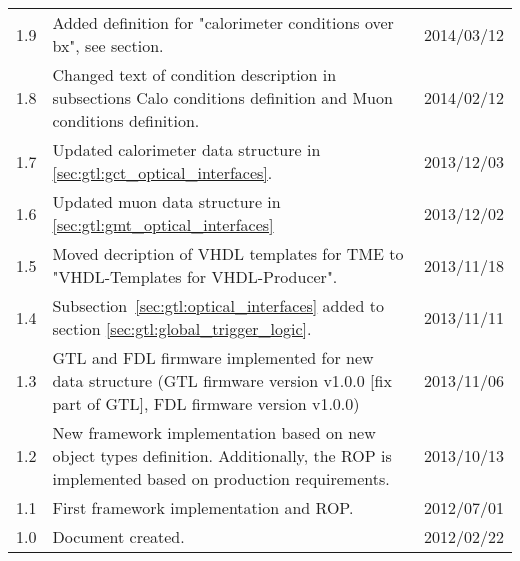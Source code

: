 \begin{longtable}{|c|p{}|c|}
$$1.9 & Added definition for "calorimeter conditions over bx", see section. & 2014/03/12\\
1.8 & Changed text of condition description in subsections Calo conditions definition and Muon conditions definition. & 2014/02/12\\
1.7 & Updated calorimeter data structure in \ref{sec:gtl:gct_optical_interfaces}. & 2013/12/03\\
1.6 & Updated muon data structure in \ref{sec:gtl:gmt_optical_interfaces} & 2013/12/02\\
1.5 & Moved decription of VHDL templates for TME to "VHDL-Templates for VHDL-Producer". & 2013/11/18\\
1.4 & Subsection~\ref{sec:gtl:optical_interfaces} added to section \ref{sec:gtl:global_trigger_logic}. & 2013/11/11\\
1.3 & GTL and FDL firmware implemented for new data structure (GTL firmware version v1.0.0 [fix part of GTL], FDL firmware version v1.0.0) & 2013/11/06\\
1.2 & New framework implementation based on new object types definition. Additionally, the ROP is implemented based on production requirements. & 2013/10/13\\
1.1 & First framework implementation and ROP. & 2012/07/01\\
1.0 & Document created. & 2012/02/22\\
\hline
\end{longtable}

\clearpage{}
